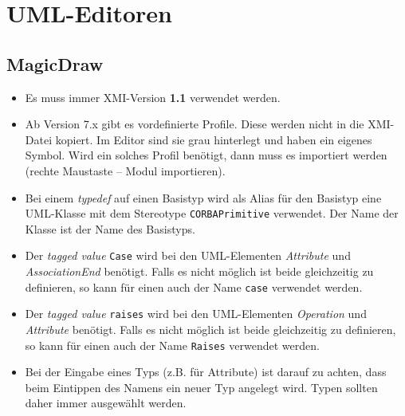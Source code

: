 \documentclass [a4paper,10pt] {scrartcl}
\begin{document}

\cleardoublepage
\section{UML-Editoren}
\subsection{MagicDraw}
\begin{itemize}
\item Es muss immer \textsf{XMI}-Version \textbf{1.1} verwendet werden.
\item Ab Version 7.x gibt es vordefinierte Profile. Diese werden nicht in
    die \textsf{XMI}-Datei kopiert. Im Editor sind sie grau hinterlegt
    und haben ein eigenes Symbol. Wird ein solches Profil ben{\"o}tigt,
    dann muss es importiert werden (rechte Maustaste -- Modul importieren).
\item Bei einem \emph{typedef} auf einen Basistyp wird als Alias f{\"u}r den
    Basistyp eine UML-Klasse mit dem Stereotype \texttt{CORBAPrimitive}
    verwendet. Der Name der Klasse ist der Name des Basistyps.
\item Der \emph{tagged value} \texttt{Case} wird bei den UML-Elementen
    \emph{Attribute} und \emph{AssociationEnd} ben{\"o}tigt.
    Falls es nicht m{\"o}glich ist beide gleichzeitig zu definieren,
    so kann f{\"u}r einen auch der Name \texttt{case} verwendet werden.
\item Der \emph{tagged value} \texttt{raises} wird bei den UML-Elementen
    \emph{Operation} und \emph{Attribute} ben{\"o}tigt.
    Falls es nicht m{\"o}glich ist beide gleichzeitig zu definieren,
    so kann f{\"u}r einen auch der Name \texttt{Raises} verwendet werden.
\item Bei der Eingabe eines Typs (z.B. f{\"u}r Attribute) ist darauf
    zu achten, dass beim Eintippen des Namens ein neuer Typ angelegt wird.
    Typen sollten daher immer ausgew{\"a}hlt werden.
\end{itemize}
\end{document}
